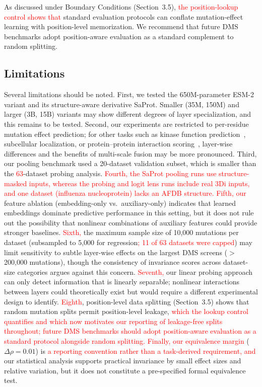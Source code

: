 \documentclass[11pt,a4paper]{article}
\newcommand{\revised}[1]{\textcolor{red}{#1}}
\begin{document}
As discussed under Boundary Conditions (Section~3.5), \revised{the position-lookup
control shows that} standard evaluation protocols can conflate mutation-effect learning with
position-level memorization. We recommend that future DMS benchmarks adopt
position-aware evaluation as a standard complement to random splitting.

\subsection{Limitations}

Several limitations should be noted. First, we tested the 650M-parameter
ESM-2 variant and its structure-aware derivative SaProt. Smaller (35M, 150M)
and larger (3B, 15B) variants may show different degrees of layer specialization,
and this remains to be tested. Second, our
experiments are restricted to per-residue mutation effect prediction; for other
tasks such as kinase function prediction~\cite{kumar2025}, subcellular
localization, or protein--protein interaction scoring~\cite{elshaffei2025},
layer-wise differences and the benefits of multi-scale fusion may be more
pronounced. Third, our pooling benchmark used a 20-dataset validation subset,
which is smaller than the \revised{63}-dataset probing analysis. \revised{Fourth,
the SaProt pooling runs use structure-masked inputs, whereas the probing and logit
lens runs include real 3Di inputs, and one dataset (influenza nucleoprotein) lacks
an AFDB structure. Fifth, our}
feature ablation (embedding-only vs.\ auxiliary-only) indicates that learned embeddings
dominate predictive performance in this setting, but it does
not rule out the possibility that nonlinear combinations of auxiliary features
could provide stronger baselines.
\revised{Sixth,} the
maximum sample size of 10,000 mutations per dataset (subsampled to 5,000 for
regression\revised{; 11 of 63 datasets were capped}) may limit sensitivity to
subtle layer-wise effects on the largest DMS screens ($>$200,000 mutations),
though the consistency of invariance scores across dataset-size categories argues
against this concern. \revised{Seventh,} our linear probing approach can only detect
information that is linearly separable; nonlinear interactions between layers
could theoretically exist but would require a different experimental design to
identify. \revised{Eighth}, position-level data splitting (Section~3.5) shows that
random mutation splits permit position-level leakage, \revised{which the lookup
control quantifies and which now motivates our reporting of leakage-free splits
throughout; future DMS benchmarks should adopt position-aware evaluation as a
standard protocol alongside random splitting. Finally, our equivalence margin}
($\Delta\rho = 0.01$) is \revised{a reporting convention rather than a
task-derived requirement, and} our
statistical analysis supports practical invariance by small effect sizes and
relative variation, but it does not constitute a pre-specified formal equivalence
test.
\end{document}
